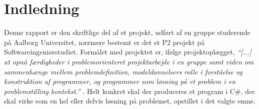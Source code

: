 \chapter{Indledning}\label{chap:indledning}



Denne rapport er den skriftlige del af et projekt, udført af en gruppe studerende på Aalborg Universitet, nærmere bestemt er det et P2 projekt på Softwareingeniørstudiet. 
Formålet med projektet er, ifølge projektoplægget, \textit{``[...] at opnå færdigheder i problemorienteret projektarbejde i en gruppe samt viden om sammenhænge mellem problemdefinition, modeldannelsers rolle i forståelse og konstruktion af programmer, og
programmer som løsning på et problem i en problemstilling kontekst.''} \citep{projektkatalog}. 
Helt konkret skal der produceres et program i C\#, der skal virke som en hel eller delvis løsning på problemet, opstillet i det valgte emne.

